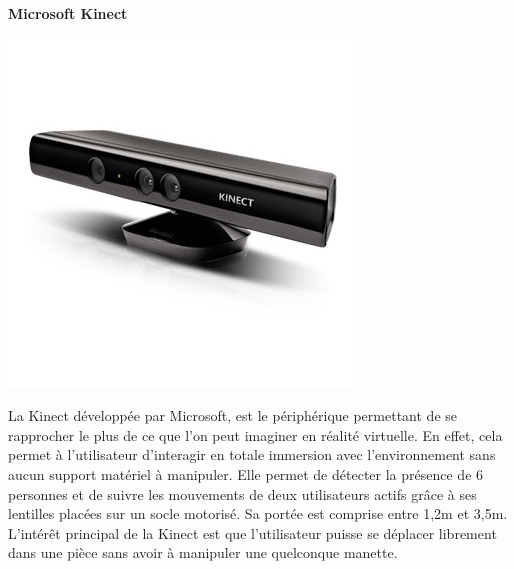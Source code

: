\textbf{Microsoft Kinect}
\\
\noindent\begin{minipage}{0.2\textwidth}
			\includegraphics[width=\linewidth]{1-PreEtude/img/kinect}
			\end{minipage}
			\hfill
			\begin{minipage}{0.8\textwidth}
La Kinect développée par Microsoft, est le périphérique permettant de se rapprocher le plus de ce que l'on peut imaginer en réalité virtuelle. En effet, cela permet à l'utilisateur d'interagir en totale immersion avec l'environnement sans aucun support matériel à manipuler. Elle permet de détecter la présence de 6 personnes et de suivre les mouvements de deux utilisateurs actifs grâce à ses lentilles placées sur un socle motorisé. Sa portée est comprise entre 1,2m et 3,5m. L'intérêt principal de la Kinect est que l'utilisateur puisse se déplacer librement dans une pièce sans avoir à manipuler une quelconque manette.
		\end{minipage}
\\

